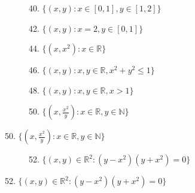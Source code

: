 \documentclass{article}
\begin{document}
\clearpage
\begin{figure}
    \centering
    \begin{subfigure}[b]{0.49\textwidth}
        \centering
        \caption*{40. $\{(x,y):x \in [0,1], y\in [1,2] \}$}
        \resizebox{1\linewidth}{!}{}
        \label{fig: freq_20Hz}
    \end{subfigure}
    \hfill
    \begin{subfigure}[b]{0.49\textwidth}
        \centering
        \caption*{42. $\{(x,y):x = 2,y \in [0,1] \}$}
        \resizebox{1\linewidth}{!}{}
        \label{fig: freq_20Hz}
    \end{subfigure}
    \hfill
    \begin{subfigure}[b]{0.49\textwidth}
        \centering
        \caption*{44. $\{(x,x^2):x \in \mathbb{R} \} $}
        \resizebox{1\linewidth}{!}{}
        \label{fig: freq_20Hz}
    \end{subfigure}
    \hfill
    \begin{subfigure}[b]{0.49\textwidth}
        \centering
        \caption*{46. $\{(x,y):x,y \in \mathbb{R},x^2+y^2\leq1 \}$}
        \resizebox{1\linewidth}{!}{}
        \label{fig: freq_20Hz}
    \end{subfigure}
    \hfill
    \begin{subfigure}[b]{0.49\textwidth}
        \centering
        \caption*{48. $\{(x,y):x,y \in \mathbb{R},x > 1 \}$}
        \resizebox{1\linewidth}{!}{}
        \label{fig: freq_20Hz}
    \end{subfigure}
    \hfill
    \begin{subfigure}[b]{0.49\textwidth}
        \centering
        \caption*{50. $\{(x,\frac{x^2}{y}):x \in \mathbb{R},y \in \mathbb{N} \}$}
        \resizebox{1\linewidth}{!}{}
        \label{fig: freq_20Hz}
    \end{subfigure}
\end{figure}
\clearpage
\begin{figure}
    \centering
    \begin{subfigure}[b]{0.49\textwidth}
        \centering
        \caption*{52. $\{(x,y) \in \mathbb{R}^2: (y-x^2)(y+x^2) =0 \}$}
        \resizebox{1\linewidth}{!}{}
        \label{fig: freq_20Hz}
    \end{subfigure}
\end{figure}
\clearpage
 
\end{document}
